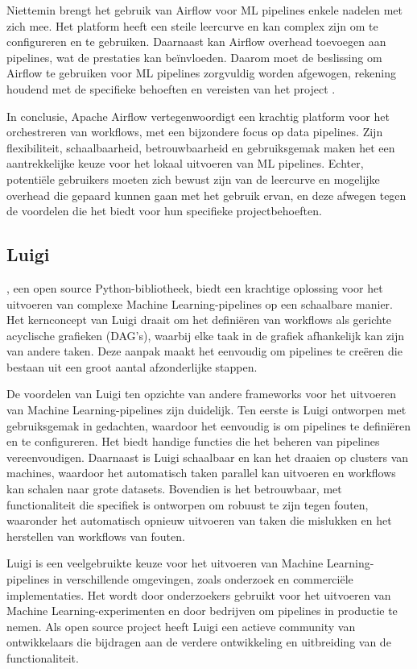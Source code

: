 Niettemin brengt het gebruik van Airflow voor ML pipelines enkele nadelen met zich mee. Het platform heeft een steile leercurve en kan complex zijn om te configureren en te gebruiken. Daarnaast kan Airflow overhead toevoegen aan pipelines, wat de prestaties kan beïnvloeden. Daarom moet de beslissing om Airflow te gebruiken voor ML pipelines zorgvuldig worden afgewogen, rekening houdend met de specifieke behoeften en vereisten van het project \autocite{Harenslak2021}.

In conclusie, Apache Airflow vertegenwoordigt een krachtig platform voor het orchestreren van workflows, met een bijzondere focus op data pipelines. Zijn flexibiliteit, schaalbaarheid, betrouwbaarheid en gebruiksgemak maken het een aantrekkelijke keuze voor het lokaal uitvoeren van ML pipelines. Echter, potentiële gebruikers moeten zich bewust zijn van de leercurve en mogelijke overhead die gepaard kunnen gaan met het gebruik ervan, en deze afwegen tegen de voordelen die het biedt voor hun specifieke projectbehoeften.

\subsection{Luigi}

\textcite{Luigi2024}, een open source Python-bibliotheek, biedt een krachtige oplossing voor het uitvoeren van complexe Machine Learning-pipelines op een schaalbare manier. Het kernconcept van Luigi draait om het definiëren van workflows als gerichte acyclische grafieken (DAG's), waarbij elke taak in de grafiek afhankelijk kan zijn van andere taken. Deze aanpak maakt het eenvoudig om pipelines te creëren die bestaan uit een groot aantal afzonderlijke stappen.

De voordelen van Luigi ten opzichte van andere frameworks voor het uitvoeren van Machine Learning-pipelines zijn duidelijk. Ten eerste is Luigi ontworpen met gebruiksgemak in gedachten, waardoor het eenvoudig is om pipelines te definiëren en te configureren. Het biedt handige functies die het beheren van pipelines vereenvoudigen. Daarnaast is Luigi schaalbaar en kan het draaien op clusters van machines, waardoor het automatisch taken parallel kan uitvoeren en workflows kan schalen naar grote datasets. Bovendien is het betrouwbaar, met functionaliteit die specifiek is ontworpen om robuust te zijn tegen fouten, waaronder het automatisch opnieuw uitvoeren van taken die mislukken en het herstellen van workflows van fouten.

Luigi is een veelgebruikte keuze voor het uitvoeren van Machine Learning-pipelines in verschillende omgevingen, zoals onderzoek en commerciële implementaties. Het wordt door onderzoekers gebruikt voor het uitvoeren van Machine Learning-experimenten en door bedrijven om pipelines in productie te nemen. Als open source project heeft Luigi een actieve community van ontwikkelaars die bijdragen aan de verdere ontwikkeling en uitbreiding van de functionaliteit.

